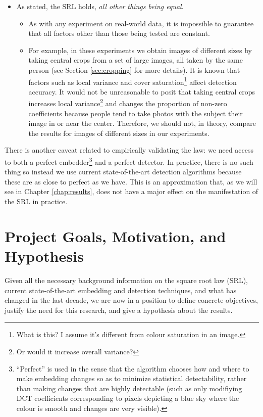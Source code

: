 \documentclass[11pt,a4paper,twoside,openright]{report}
\begin{document}
\begin{itemize}
	\item As stated, the SRL holds, \textit{all other things being equal}.
		\begin{itemize}
			\item As with any experiment on real-world data, it is impossible to guarantee that all factors other than those being tested are constant.
			\item For example, in these experiments we obtain images of different sizes by taking central crops from a set of large images, all taken by the same person (see Section \ref{sec:cropping} for more details). It is known \cite{steganalysis-error-model} that factors such as local variance and cover saturation\footnote{What is this? I assume it's different from colour saturation in an image.} affect detection accuracy. It would not be unreasonable to posit that taking central crops increases local variance\footnote{Or would it increase overall variance?} and changes the proportion of non-zero coefficients because people tend to take photos with the subject their image in or near the center. Therefore, we should not, in theory, compare the results for images of different sizes in our experiments.
		\end{itemize}

\end{itemize}


There is another caveat related to empirically validating the law: we need access to both a perfect embedder\footnote{``Perfect'' is used in the sense that the algorithm chooses how and where to make embedding changes so as to minimize statistical detectability, rather than making changes that are highly detectable (such as only modifiying DCT coefficients corresponding to pixels depicting a blue sky where the colour is smooth and changes are very visible).} and a perfect detector. In practice, there is no such thing so instead we use current state-of-the-art detection algorithms because these are as close to perfect as we have. This is an approximation that, as we will see in Chapter \ref{chap:results}, does not have a major effect on the manifestation of the SRL in practice.


\section{Project Goals, Motivation, and Hypothesis}

Given all the necessary background information on the square root law (SRL), current state-of-the-art embedding and detection techniques, and what has changed in the last decade, we are now in a position to define concrete objectives, justify the need for this research, and give a hypothesis about the results.
\end{document}
